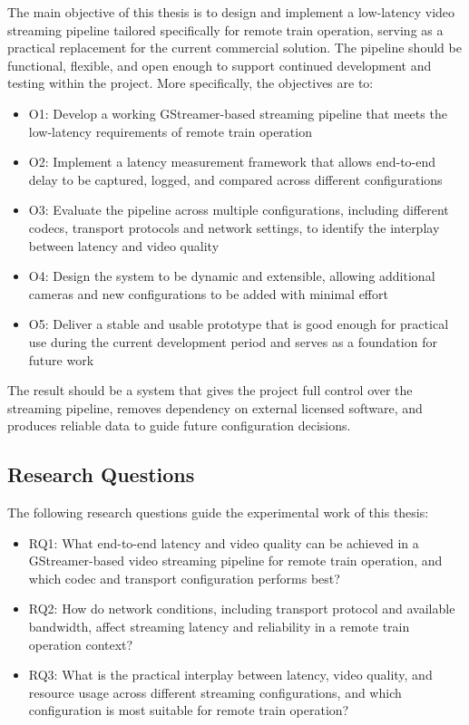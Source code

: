 The main objective of this thesis is to design and implement a low-latency video streaming pipeline tailored specifically for remote train operation, serving as a practical replacement for the current commercial solution. The pipeline should be functional, flexible, and open enough to support continued development and testing within the project.
More specifically, the objectives are to:

\begin{itemize}
    \item O1: Develop a working GStreamer-based streaming pipeline that meets the low-latency requirements of remote train operation
    \item O2: Implement a latency measurement framework that allows end-to-end delay to be captured, logged, and compared across different configurations
    \item O3: Evaluate the pipeline across multiple configurations, including different codecs, transport protocols and network settings, to identify the interplay between latency and video quality
    \item O4: Design the system to be dynamic and extensible, allowing additional cameras and new configurations to be added with minimal effort
    \item O5: Deliver a stable and usable prototype that is good enough for practical use during the current development period and serves as a foundation for future work
\end{itemize}

The result should be a system that gives the project full control over the streaming pipeline, removes dependency on external licensed software, and produces reliable data to guide future configuration decisions.

\subsection{Research Questions}
The following research questions guide the experimental work of this thesis:
\begin{itemize}
    \item RQ1: What end-to-end latency and video quality can be achieved in a GStreamer-based video streaming pipeline for remote train operation, and which codec and transport configuration performs best?
    \item RQ2: How do network conditions, including transport protocol and available bandwidth, affect streaming latency and reliability in a remote train operation context?
    \item RQ3: What is the practical interplay between latency, video quality, and resource usage across different streaming configurations, and which configuration is most suitable for remote train operation?
\end{itemize}

